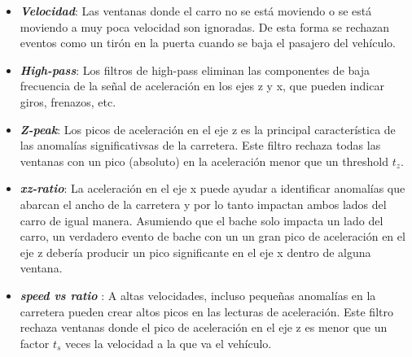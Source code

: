 \begin{itemize}
	\item \emph{\textbf {Velocidad}}: Las ventanas donde el carro no se está moviendo o se está moviendo a muy poca velocidad son ignoradas.
	      De esta forma se rechazan eventos como un tirón en la puerta cuando se baja el pasajero del vehículo.\\
	\item \emph{\textbf {High-pass}}: Los filtros de high-pass eliminan las componentes de baja frecuencia de la señal de aceleración en los ejes z y x,
	      que pueden indicar giros, frenazos, etc.\\
	\item  \emph{\textbf {Z-peak}}: Los picos de aceleración en el eje z es la principal característica de las anomalías significativsas de la carretera.
	      Este filtro rechaza todas las ventanas con un pico (absoluto) en la aceleración menor que un threshold $t_z$.\\
	\item  \emph{\textbf {xz-ratio}}: La aceleración en el eje x puede ayudar a identificar anomalías que abarcan el ancho de la carretera y por lo tanto
	      impactan ambos lados del carro de igual manera.  Asumiendo que el bache solo impacta un lado del carro, un verdadero evento de bache con un
	      un gran pico de aceleración en el eje z debería producir un pico significante en el eje x dentro de alguna ventana.\\
	\item  \emph{\textbf {speed vs ratio }}:	A altas velocidades, incluso pequeñas anomalías en la carretera pueden crear altos picos en las lecturas
	      de aceleración. Este filtro rechaza ventanas donde el pico de aceleración en el eje z es menor que un factor $t_s$ veces la velocidad a la que
	      va el vehículo.
\end{itemize}

